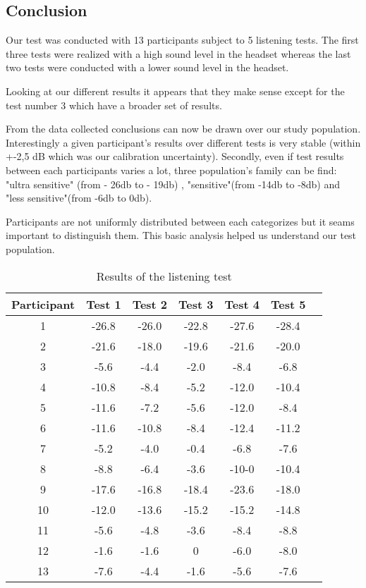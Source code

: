 \subsection{Conclusion}

Our test was conducted with 13 participants subject to 5 listening tests. The first three tests were realized with a high sound level in the headset whereas the last two tests were conducted with a lower sound level in the headset. 

Looking at our different results it appears that they make sense except for the test number 3 which have a broader set of results. 

From the data collected conclusions can now be drawn over our study population. 
Interestingly a given participant's results over different tests is very stable (within +-2,5 dB which was our calibration uncertainty).  Secondly, even if test results between each participants varies a lot, three population's family can be find: "ultra sensitive" (from - 26db to - 19db) , "sensitive"(from -14db to -8db) and "less sensitive"(from -6db to 0db). 

Participants are not uniformly distributed between each categorizes but it seams important to distinguish them. This basic analysis helped us understand our test population.

\begin{table}[H]
\centering
\begin{tabular}{*{7}{c}}
  \hline
  Participant & Test 1 & Test 2 & Test 3  & Test 4  & Test 5  
  \\
  \hline
  1 & -26.8 & -26.0 &	-22.8 & -27.6 & -28.4 \\
  2 & -21.6 & -18.0 & -19.6  & -21.6  & -20.0 \\
  3 & -5.6 & -4.4 & -2.0 & -8.4 & -6.8  \\
  4 & -10.8 & -8.4 & -5.2 & -12.0 & -10.4 \\
  5 & -11.6 & -7.2 & -5.6	 & -12.0 & -8.4 \\
  6 & -11.6 & -10.8 & -8.4 & -12.4 & -11.2 \\
  7 & -5.2 & -4.0 & -0.4 & -6.8 & -7.6 \\
  8 & -8.8 & -6.4 & -3.6 & -10-0 & -10.4 \\
  9 & -17.6 & -16.8 & -18.4 & -23.6 & -18.0 \\
  10 & -12.0 & -13.6 & -15.2 & -15.2 & 	-14.8 \\
  11 & -5.6 & -4.8 & -3.6 & -8.4 & -8.8 \\
  12 & -1.6 & -1.6 & 0	 & -6.0 & 	-8.0 \\
  13 & -7.6 & -4.4 & -1.6	 & -5.6 & 	-7.6   \\
  \hline
\end{tabular}
  \caption{Results of the listening test}
	\label{tab:ListeningResults}
\end{table}

